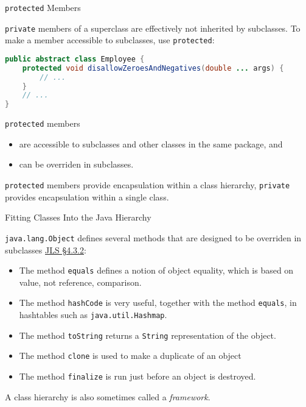 \documentclass{beamer}
\begin{document}
\begin{frame}[fragile]{{\tt protected} Members}


{\tt private} members of a superclass are effectively not inherited by subclasses.  To make a member accessible to subclasses, use {\tt protected}:
\begin{lstlisting}[language=Java]
public abstract class Employee {
    protected void disallowZeroesAndNegatives(double ... args) {
        // ...
    }
    // ...
}
\end{lstlisting}
{\tt protected} members
\begin{itemize}
\item are accessible to subclasses and other classes in the same package, and
\item can be overriden in subclasses.
\end{itemize}
{\tt protected} members provide encapsulation within a class hierarchy, {\tt private} provides encapsulation within a single class.

\end{frame}

\begin{frame}[fragile]{Fitting Classes Into the Java Hierarchy}


{\tt java.lang.Object} defines several methods that are designed to be overriden in subclasses \href{http://docs.oracle.com/javase/specs/jls/se7/html/jls-4.html#jls-4.3.2}{JLS \S 4.3.2}: 
\begin{itemize}
\item The method {\tt equals} defines a notion of object equality, which is based on value, not reference, comparison.
\item The method {\tt hashCode} is very useful, together with the method {\tt equals}, in hashtables such as {\tt java.util.Hashmap}.
\item The method {\tt toString} returns a {\tt String} representation of the object.
\item The method {\tt clone} is used to make a duplicate of an object
\item The method {\tt finalize} is run just before an object is destroyed.
\end{itemize}

A class hierarchy is also sometimes called a {\it framework}.

\end{frame}
\end{document}
